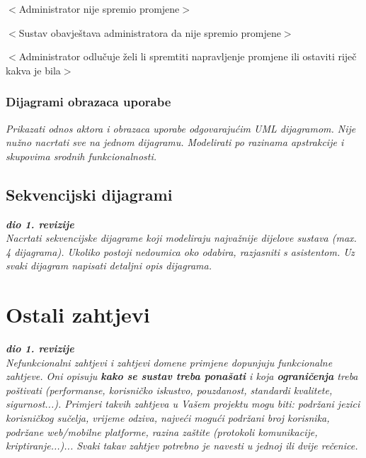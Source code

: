 \begin{packed_item}
\begin{packed_item}
\begin{packed_enum}
							\end{packed_enum}
							\item[8.a] $<$Administrator nije spremio promjene$>$
							\item[] \begin{packed_enum}
								
								\item $<$Sustav obavještava administratora da nije spremio promjene$>$
								\item $<$Administrator odlučuje želi li spremtiti napravljenje promjene ili ostaviti riječ kakva je bila$>$
								
							\end{packed_enum}

						\end{packed_item}			
					\end{packed_item}
				
					
				\subsubsection{Dijagrami obrazaca uporabe}
					
					\textit{Prikazati odnos aktora i obrazaca uporabe odgovarajućim UML dijagramom. Nije nužno nacrtati sve na jednom dijagramu. Modelirati po razinama apstrakcije i skupovima srodnih funkcionalnosti.}
				\eject		
				
			\subsection{Sekvencijski dijagrami}
				
				\textbf{\textit{dio 1. revizije}}\\
				
				\textit{Nacrtati sekvencijske dijagrame koji modeliraju najvažnije dijelove sustava (max. 4 dijagrama). Ukoliko postoji nedoumica oko odabira, razjasniti s asistentom. Uz svaki dijagram napisati detaljni opis dijagrama.}
				\eject
	
		\section{Ostali zahtjevi}
		
			\textbf{\textit{dio 1. revizije}}\\
		 
			 \textit{Nefunkcionalni zahtjevi i zahtjevi domene primjene dopunjuju funkcionalne zahtjeve. Oni opisuju \textbf{kako se sustav treba ponašati} i koja \textbf{ograničenja} treba poštivati (performanse, korisničko iskustvo, pouzdanost, standardi kvalitete, sigurnost...). Primjeri takvih zahtjeva u Vašem projektu mogu biti: podržani jezici korisničkog sučelja, vrijeme odziva, najveći mogući podržani broj korisnika, podržane web/mobilne platforme, razina zaštite (protokoli komunikacije, kriptiranje...)... Svaki takav zahtjev potrebno je navesti u jednoj ili dvije rečenice.}
			 
			 
			 
	